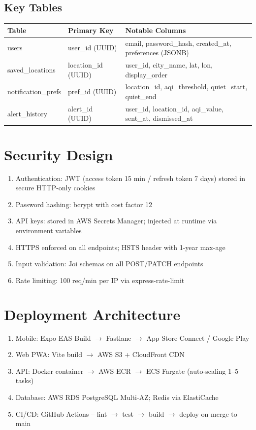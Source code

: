 \documentclass[12pt]{article}
\begin{document}
\subsection{Key Tables}

\begin{center}
\begin{longtable}{|p{4cm}|p{3cm}|p{6cm}|}
\hline
\textbf{Table} & \textbf{Primary Key} & \textbf{Notable Columns} \\
\hline
users & user\_id (UUID) & email, password\_hash, created\_at, preferences (JSONB) \\
\hline
saved\_locations & location\_id (UUID) & user\_id, city\_name, lat, lon, display\_order \\
\hline
notification\_prefs & pref\_id (UUID) & location\_id, aqi\_threshold, quiet\_start, quiet\_end \\
\hline
alert\_history & alert\_id (UUID) & user\_id, location\_id, aqi\_value, sent\_at, dismissed\_at \\
\hline
\end{longtable}
\end{center}

\section{Security Design}

\begin{enumerate}
    \item Authentication: JWT (access token 15 min / refresh token 7 days) stored in secure HTTP-only cookies
    \item Password hashing: bcrypt with cost factor 12
    \item API keys: stored in AWS Secrets Manager; injected at runtime via environment variables
    \item HTTPS enforced on all endpoints; HSTS header with 1-year max-age
    \item Input validation: Joi schemas on all POST/PATCH endpoints
    \item Rate limiting: 100 req/min per IP via express-rate-limit
\end{enumerate}

\section{Deployment Architecture}

\begin{enumerate}
    \item Mobile: Expo EAS Build $\rightarrow$ Fastlane $\rightarrow$ App Store Connect / Google Play
    \item Web PWA: Vite build $\rightarrow$ AWS S3 + CloudFront CDN
    \item API: Docker container $\rightarrow$ AWS ECR $\rightarrow$ ECS Fargate (auto-scaling 1--5 tasks)
    \item Database: AWS RDS PostgreSQL Multi-AZ; Redis via ElastiCache
    \item CI/CD: GitHub Actions -- lint $\rightarrow$ test $\rightarrow$ build $\rightarrow$ deploy on merge to main
\end{enumerate}

\vspace{1cm}
\end{document}
